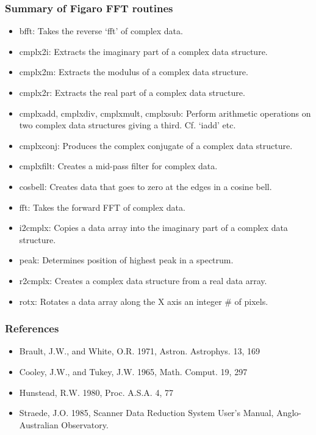 
\subsubsection{\label{techno6summary}Summary of Figaro FFT routines}

\begin{itemize}
\item
   bfft: Takes the reverse `fft' of complex data.
\item
   cmplx2i: Extracts the imaginary part of a complex data structure.
\item
   cmplx2m: Extracts the modulus of a complex data structure.
\item
   cmplx2r: Extracts the real part of a complex data structure.
\item
   cmplxadd, cmplxdiv, cmplxmult, cmplxsub: Perform arithmetic operations
   on two complex data structures giving a third.  Cf. `iadd' etc.
\item
   cmplxconj: Produces the complex conjugate of a
   complex data structure.
\item
   cmplxfilt: Creates a mid-pass filter for complex data.
\item
   cosbell: Creates data that goes to zero at the edges in a
   cosine bell.
\item
   fft: Takes the forward FFT of complex data.
\item
   i2cmplx: Copies a data array into the imaginary part of a complex
   data structure.
\item
   peak: Determines position of highest peak in a spectrum.
\item
   r2cmplx: Creates a complex data structure from a real data array.
\item
   rotx: Rotates a data array along the X axis an integer \# of pixels.
\end{itemize}


\subsubsection{\label{techno6refer}References}

\begin{itemize}
\item
   Brault, J.W., and White, O.R. 1971, Astron. Astrophys. 13, 169
\item
   Cooley, J.W., and Tukey, J.W. 1965, Math. Comput. 19, 297
\item
   Hunstead, R.W. 1980, Proc. A.S.A. 4, 77
\item
   Straede, J.O. 1985, Scanner Data Reduction System User's Manual,
   Anglo-Australian Observatory.
\end{itemize}

